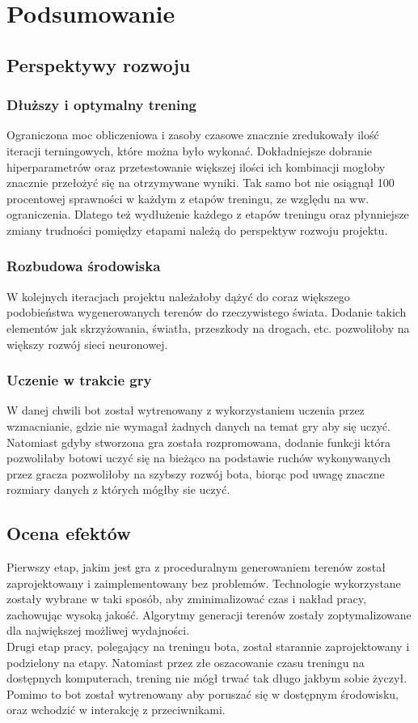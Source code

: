 \chapter*{Podsumowanie}
\thispagestyle{chapterBeginStyle}
\section{Perspektywy rozwoju}

\subsection{Dłuższy i optymalny trening}
Ograniczona moc obliczeniowa i zasoby czasowe znacznie zredukowały ilość iteracji terningowych, które można było wykonać. Dokładniejsze dobranie hiperparametrów oraz przetestowanie większej ilości ich kombinacji mogłoby znacznie przełożyć się na otrzymywane wyniki. Tak samo bot nie osiągnął 100 procentowej sprawności w każdym z etapów treningu, ze względu na ww. ograniczenia. Dlatego też wydłużenie każdego z etapów treningu oraz płynniejsze zmiany trudności pomiędzy etapami należą do perspektyw rozwoju projektu.

\subsection{Rozbudowa środowiska}
W kolejnych iteracjach projektu należałoby dążyć do coraz większego podobieństwa wygenerowanych terenów do rzeczywistego świata. Dodanie takich elementów jak skrzyżowania, światła, przeszkody na drogach, etc. pozwoliłoby na większy rozwój sieci neuronowej.

\subsection{Uczenie w trakcie gry}
W danej chwili bot został wytrenowany z wykorzystaniem uczenia przez wzmacnianie, gdzie nie wymagał żadnych danych na temat gry aby się uczyć. Natomiast gdyby stworzona gra została rozpromowana, dodanie funkcji która pozwoliłaby botowi uczyć się na bieżąco na podstawie ruchów wykonywanych przez gracza pozwoliłoby na szybszy rozwój bota, biorąc pod uwagę znaczne rozmiary danych z których mógłby sie uczyć.

\section{Ocena efektów}
Pierwszy etap, jakim jest gra z proceduralnym generowaniem terenów został zaprojektowany i zaimplementowany bez problemów. Technologie wykorzystane zostały wybrane w taki sposób, aby zminimalizować czas i nakład pracy, zachowując wysoką jakość. Algorytmy generacji terenów zostały zoptymalizowane dla największej możliwej wydajności.\\
Drugi etap pracy, polegający na treningu bota, został starannie zaprojektowany i podzielony na etapy. Natomiast przez złe oszacowanie czasu treningu na dostępnych komputerach, trening nie mógł trwać tak długo jakbym sobie życzył. Pomimo to bot został wytrenowany aby poruszać się w dostępnym środowisku, oraz wchodzić w interakcję z przeciwnikami.

